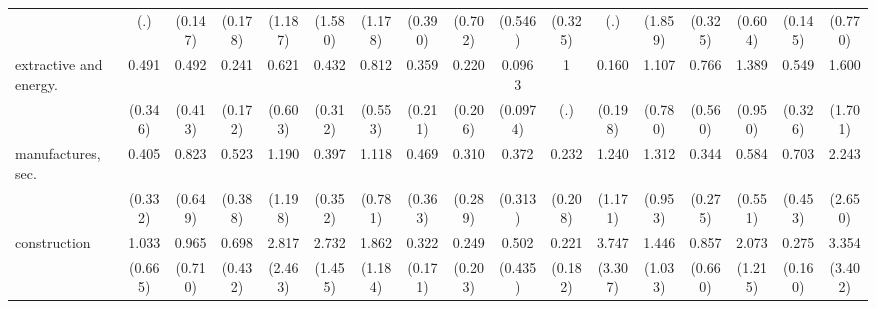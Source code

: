 {\begin{tabular}{l*{16}{c}}
                    &         (.)         &     (0.147)         &     (0.178)         &     (1.187)         &     (1.580)         &     (1.178)         &     (0.390)         &     (0.702)         &     (0.546)         &     (0.325)         &         (.)         &     (1.859)         &     (0.325)         &     (0.604)         &     (0.145)         &     (0.770)         \\
[1em]
extractive and energy.&       0.491         &       0.492         &       0.241\sym{*}  &       0.621         &       0.432         &       0.812         &       0.359         &       0.220         &      0.0963\sym{*}  &           1         &       0.160         &       1.107         &       0.766         &       1.389         &       0.549         &       1.600         \\
                    &     (0.346)         &     (0.413)         &     (0.172)         &     (0.603)         &     (0.312)         &     (0.553)         &     (0.211)         &     (0.206)         &    (0.0974)         &         (.)         &     (0.198)         &     (0.780)         &     (0.560)         &     (0.950)         &     (0.326)         &     (1.701)         \\
[1em]
manufactures, sec.  &       0.405         &       0.823         &       0.523         &       1.190         &       0.397         &       1.118         &       0.469         &       0.310         &       0.372         &       0.232         &       1.240         &       1.312         &       0.344         &       0.584         &       0.703         &       2.243         \\
                    &     (0.332)         &     (0.649)         &     (0.388)         &     (1.198)         &     (0.352)         &     (0.781)         &     (0.363)         &     (0.289)         &     (0.313)         &     (0.208)         &     (1.171)         &     (0.953)         &     (0.275)         &     (0.551)         &     (0.453)         &     (2.650)         \\
[1em]
construction        &       1.033         &       0.965         &       0.698         &       2.817         &       2.732         &       1.862         &       0.322\sym{*}  &       0.249         &       0.502         &       0.221         &       3.747         &       1.446         &       0.857         &       2.073         &       0.275\sym{*}  &       3.354         \\
                    &     (0.665)         &     (0.710)         &     (0.432)         &     (2.463)         &     (1.455)         &     (1.184)         &     (0.171)         &     (0.203)         &     (0.435)         &     (0.182)         &     (3.307)         &     (1.033)         &     (0.660)         &     (1.215)         &     (0.160)         &     (3.402)         \\

\end{tabular}}
